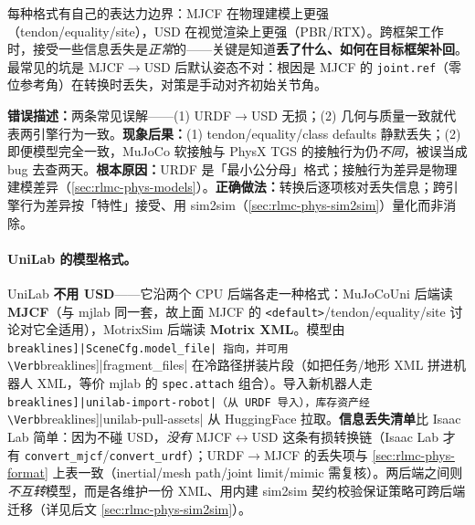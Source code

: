 \begin{insight}\label{ins:rlmc-phys-format}
每种格式有自己的表达力边界：MJCF 在物理建模上更强（tendon/equality/site），USD 在视觉渲染上更强（PBR/RTX）。跨框架工作时，接受一些信息丢失是\emph{正常}的——关键是知道\textbf{丢了什么、如何在目标框架补回}。最常见的坑是 MJCF$\to$USD 后默认姿态不对：根因是 MJCF 的 \verb|joint.ref|（零位参考角）在转换时丢失，对策是手动对齐初始关节角。
\end{insight}

\begin{pitfall}[假设 URDF$\to$USD 转换无损 / 认为「模型相同 $=$ 行为相同」]
\textbf{错误描述：}两条常见误解——(1) URDF$\to$USD 无损；(2) 几何与质量一致就代表两引擎行为一致。\textbf{现象后果：}(1) tendon/equality/class defaults 静默丢失；(2) 即便模型完全一致，MuJoCo 软接触与 PhysX TGS 的接触行为仍\emph{不同}，被误当成 bug 去查两天。\textbf{根本原因：}URDF 是「最小公分母」格式；接触行为差异是物理建模差异（\cref{sec:rlmc-phys-models}）。\textbf{正确做法：}转换后逐项核对丢失信息；跨引擎行为差异按「特性」接受、用 sim2sim（\cref{sec:rlmc-phys-sim2sim}）量化而非消除。
\end{pitfall}

\paragraph{UniLab 的模型格式。}UniLab \textbf{不用 USD}——它沿两个 CPU 后端各走一种格式：MuJoCoUni 后端读 \textbf{MJCF}（与 mjlab 同一套，故上面 MJCF 的 \verb|<default>|/tendon/equality/site 讨论对它全适用），MotrixSim 后端读 \textbf{Motrix XML}。模型由 \Verb[breaklines]|SceneCfg.model_file| 指向，并可用 \Verb[breaklines]|fragment_files| 在冷路径拼装片段（如把任务/地形 XML 拼进机器人 XML，等价 mjlab 的 \verb|spec.attach| 组合）。导入新机器人走 \Verb[breaklines]|unilab-import-robot|（从 URDF 导入），库存资产经 \Verb[breaklines]|unilab-pull-assets| 从 HuggingFace 拉取。\textbf{信息丢失清单}比 Isaac Lab 简单：因为不碰 USD，\emph{没有} MJCF$\leftrightarrow$USD 这条有损转换链（Isaac Lab 才有 \verb|convert_mjcf|/\allowbreak\verb|convert_urdf|）；URDF$\to$MJCF 的丢失项与 \cref{sec:rlmc-phys-format} 上表一致（inertial/mesh path/joint limit/mimic 需复核）。两后端之间则\emph{不互转}模型，而是各维护一份 XML、用内建 sim2sim 契约校验保证策略可跨后端迁移（详见后文 \cref{sec:rlmc-phys-sim2sim}）。

\begin{practice}[本节练习]
\end{practice}

